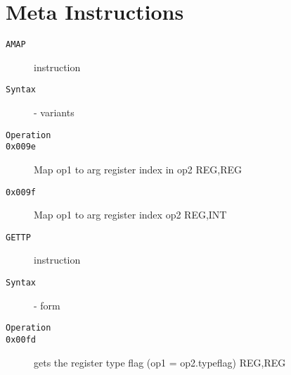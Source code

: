 \section{Meta Instructions}
\begin{description}
\item[\texttt{AMAP}] instruction\\
\item[\texttt{Syntax}] - variants\\

\item[\texttt{Operation}]
\item[\texttt{}]
\item[\texttt{0x009e}] Map op1 to arg register index in op2  {REG,REG}           \\
\item[\texttt{0x009f}] Map op1 to arg register index  op2  {REG,INT}           \\
\end{description}
\clearpage
\begin{description}
\item[\texttt{GETTP}] instruction\\
\item[\texttt{Syntax}] - form \\

\item[\texttt{Operation}]
\item[\texttt{}]
\item[\texttt{0x00fd}] gets the register type flag (op1 = op2.typeflag)  {REG,REG}           \\
\end{description}
\clearpage
